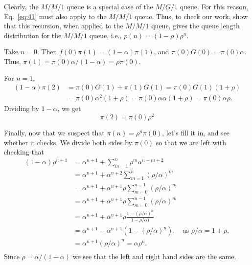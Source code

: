 \begin{question}
  Clearly, the $M/M/1$ queue is a special case of the $M/G/1$
  queue. For this reason, Eq.~\eqref{eq:41} must also apply to the
  $M/M/1$ queue.  Thus, to check our work, show that this recursion,
  when applied to the $M/M/1$ queue, gives the queue length
  distribution for the $M/M/1$ queue, i.e., $p(n)=(1-\rho)\rho^n$. 

  \begin{hint}
    
  \end{hint}

    \begin{solution}
      Take $n=0$. Then $f(0) \pi(1) = (1-\alpha)\pi(1)$, and
      $\pi(0)G(0) = \pi(0)\alpha$. Thus,
      $\pi(1) = \pi(0)\alpha/(1-\alpha) = \rho \pi(0)$. 

For $n=1$,
\begin{equation*}
  \begin{split}
  (1-\alpha)  \pi(2) 
&= \pi(0)G(1) + \pi(1)G(1) = \pi(0)G(1)(1+\rho) \\
&= \pi(0)\alpha^2(1+\rho) = \pi(0)\alpha \alpha (1+\rho) = \pi(0)\alpha \rho.
  \end{split}
\end{equation*}
Dividing by $1-\alpha$, we get
\begin{equation*}
  \pi(2) = \pi(0)\rho^2
\end{equation*}

Finally, now that we suspect that $\pi(n) = \rho^n \pi(0)$, let's fill
it in, and see whether it checks. We divide both sides by $\pi(0)$ so
that we are left with checking that
\begin{equation*}
  \begin{split}
    (1-\alpha)\rho^{n+1} 
&= \alpha^{n+1} + \sum_{m=1}^n \rho^m \alpha^{n-m+2}  \\
&= \alpha^{n+1} + \alpha^{n+2}\sum_{m=1}^n (\rho/\alpha)^m  \\
&= \alpha^{n+1} + \alpha^{n+1}\rho \sum_{m=0}^{n-1} (\rho/\alpha)^m \\
&= \alpha^{n+1} + \alpha^{n+1}\rho \sum_{m=0}^{n-1} (\rho/\alpha)^m\\
&= \alpha^{n+1} + \alpha^{n+1}\rho \frac{1-(\rho/\alpha)^n}{1-\rho/\alpha)}\\
&= \alpha^{n+1} - \alpha^{n+1}(1-(\rho/\alpha)^n), \quad\text{as } \rho/\alpha = 1+\rho,\\
&= \alpha^{n+1}(\rho/\alpha)^n = \alpha \rho^n.\\
  \end{split}
\end{equation*}
Since $\rho=\alpha/(1-\alpha)$ we see that the left and right hand sides are the same. 


\end{solution}
\end{question}
